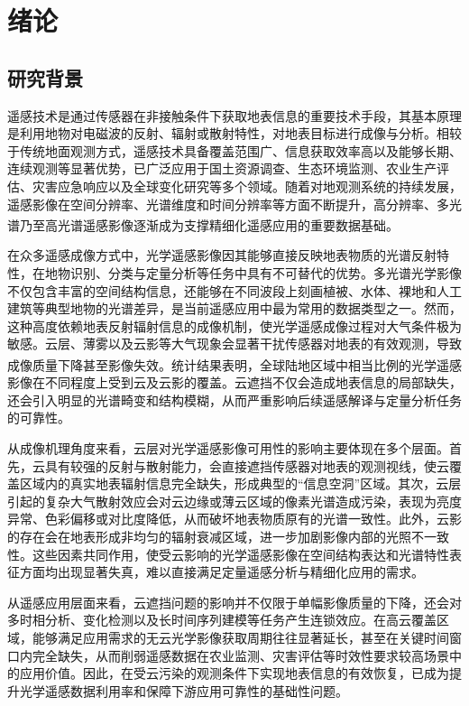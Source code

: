 


\chapter{绪论}
\thispagestyle{others}
\pagestyle{others}
\xiaosi

\section{研究背景}

遥感技术是通过传感器在非接触条件下获取地表信息的重要技术手段，其基本原理是利用地物对电磁波的反射、辐射或散射特性，对地表目标进行成像与分析。相较于传统地面观测方式，遥感技术具备覆盖范围广、信息获取效率高以及能够长期、连续观测等显著优势，已广泛应用于国土资源调查、生态环境监测、农业生产评估、灾害应急响应以及全球变化研究等多个领域。随着对地观测系统的持续发展，遥感影像在空间分辨率、光谱维度和时间分辨率等方面不断提升，高分辨率、多光谱乃至高光谱遥感影像逐渐成为支撑精细化遥感应用的重要数据基础\textsuperscript{\cite{ning2025cloud}}。

在众多遥感成像方式中，光学遥感影像因其能够直接反映地表物质的光谱反射特性，在地物识别、分类与定量分析等任务中具有不可替代的优势。多光谱光学影像不仅包含丰富的空间结构信息，还能够在不同波段上刻画植被、水体、裸地和人工建筑等典型地物的光谱差异，是当前遥感应用中最为常用的数据类型之一。然而，这种高度依赖地表反射辐射信息的成像机制，使光学遥感成像过程对大气条件极为敏感。云层、薄雾以及云影等大气现象会显著干扰传感器对地表的有效观测，导致成像质量下降甚至影像失效。统计结果表明\textsuperscript{\cite{king2013spatial}}，全球陆地区域中相当比例的光学遥感影像在不同程度上受到云及云影的覆盖。云遮挡不仅会造成地表信息的局部缺失，还会引入明显的光谱畸变和结构模糊，从而严重影响后续遥感解译与定量分析任务的可靠性。

从成像机理角度来看，云层对光学遥感影像可用性的影响主要体现在多个层面。首先，云具有较强的反射与散射能力，会直接遮挡传感器对地表的观测视线，使云覆盖区域内的真实地表辐射信息完全缺失，形成典型的“信息空洞”区域。其次，云层引起的复杂大气散射效应会对云边缘或薄云区域的像素光谱造成污染，表现为亮度异常、色彩偏移或对比度降低，从而破坏地表物质原有的光谱一致性。此外，云影的存在会在地表形成非均匀的辐射衰减区域，进一步加剧影像内部的光照不一致性。这些因素共同作用，使受云影响的光学遥感影像在空间结构表达和光谱特性表征方面均出现显著失真，难以直接满足定量遥感分析与精细化应用的需求。

从遥感应用层面来看，云遮挡问题的影响并不仅限于单幅影像质量的下降，还会对多时相分析、变化检测以及长时间序列建模等任务产生连锁效应。在高云覆盖区域，能够满足应用需求的无云光学影像获取周期往往显著延长，甚至在关键时间窗口内完全缺失，从而削弱遥感数据在农业监测、灾害评估等时效性要求较高场景中的应用价值。因此，在受云污染的观测条件下实现地表信息的有效恢复，已成为提升光学遥感数据利用率和保障下游应用可靠性的基础性问题。


